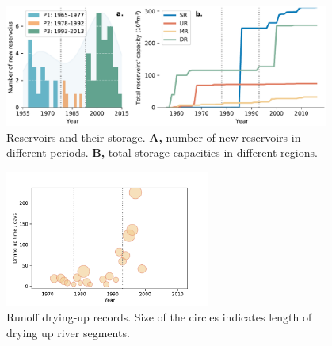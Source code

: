 \documentclass[9pt,twoside,lineno]{pnas-new}
\begin{document}
\begin{figure}
    \centering
    \includegraphics[width=0.95\textwidth]{../../figures/sup/reservoirs.pdf}
    \caption{
        Reservoirs and their storage.
        \textbf{A,} number of new reservoirs in different periods.
        \textbf{B,} total storage capacities in different regions. 
    }
\end{figure}



\begin{figure}
    \centering
    \includegraphics[width=0.6\textwidth]{../../figures/sup/outages.pdf}
    \caption{Runoff drying-up records. Size of the circles indicates length of drying up river segments.}
\end{figure}
\end{document}
